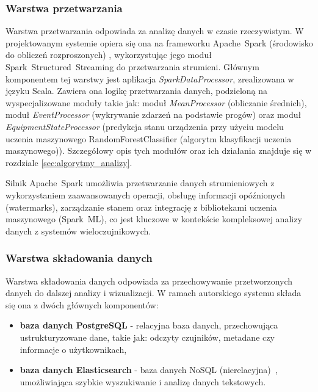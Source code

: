 \subsubsection{Warstwa przetwarzania}
\label{subsubsec:warstwa_przetwarzania}

Warstwa przetwarzania odpowiada za analizę danych w czasie rzeczywistym. W projektowanym systemie opiera się ona na frameworku \mbox{Apache Spark} (środowisko do obliczeń rozproszonych) \cite{spark_streaming}, wykorzystując jego moduł \mbox{Spark Structured Streaming} do przetwarzania strumieni. Głównym komponentem tej warstwy jest aplikacja \textit{\mbox{SparkDataProcessor}}, zrealizowana w języku Scala. Zawiera ona logikę przetwarzania danych, podzieloną na wyspecjalizowane moduły takie jak: moduł \mbox{\textit{MeanProcessor}} (obliczanie średnich), moduł \textit{\mbox{EventProcessor}} (wykrywanie zdarzeń na podstawie progów) oraz moduł \textit{\mbox{EquipmentStateProcessor}} (predykcja stanu urządzenia przy użyciu modelu uczenia maszynowego \mbox{RandomForestClassifier} (algorytm klasyfikacji uczenia maszynowego)). Szczegółowy opis tych modułów oraz ich działania znajduje się w rozdziale \ref{sec:algorytmy_analizy}.

Silnik \mbox{Apache Spark} umożliwia przetwarzanie danych strumieniowych z wykorzystaniem zaawansowanych operacji, obsługę informacji opóźnionych (watermarks), zarządzanie stanem oraz integrację z bibliotekami uczenia maszynowego (\mbox{Spark ML}), co jest kluczowe w kontekście kompleksowej analizy danych z systemów wieloczujnikowych.

\newpage


\subsubsection{Warstwa składowania danych}
\label{subsubsec:warstwa_skladowania}

Warstwa składowania danych odpowiada za przechowywanie przetworzonych danych do dalszej analizy i wizualizacji. W ramach autorskiego systemu składa się ona z dwóch głównych komponentów:

\begin{itemize}
    \item \textbf{baza danych PostgreSQL} - relacyjna baza danych, przechowująca ustrukturyzowane dane, takie jak: odczyty czujników, metadane czy informacje o użytkownikach,
    \item \textbf{baza danych Elasticsearch} - baza danych \mbox{NoSQL} (nierelacyjna)~\cite{nosql_definition}, umożliwiająca szybkie wyszukiwanie i analizę danych tekstowych.
\end{itemize}

